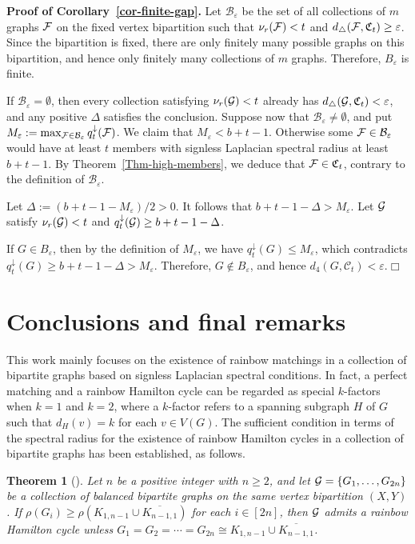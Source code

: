 \documentclass[11pt,a4paper]{article}
\newtheorem{theorem}{Theorem}[section]
\theoremstyle{definition}
\numberwithin{equation}{section}
\def\qed{\hfill$\Box$\vspace{12pt}}
\begin{document}
\noindent \textbf{Proof of Corollary~\ref{cor-finite-gap}.}
Let $\mathcal B_\varepsilon$ be the set of all collections of $m$ graphs ${\cal F}$ on the fixed vertex bipartition such that $\nu_r({\cal F})<t$ and $d_\triangle({\cal F},\mathfrak C_t)\ge\varepsilon$. Since the bipartition is fixed, there are only finitely many possible graphs on this bipartition, and hence only finitely many collections of
$m$ graphs. Therefore, $B_\varepsilon$ is finite.

If $\mathcal B_\varepsilon=\emptyset$, then every collection satisfying $\nu_r({\cal G})<t$ already has $d_\triangle({\cal G},\mathfrak C_t)<\varepsilon$, and any positive $\Delta$ satisfies the conclusion. Suppose now that $\mathcal B_\varepsilon\ne\emptyset$, and put $M_\varepsilon:=\max_{{\cal F}\in\mathcal B_\varepsilon} q_t^\downarrow({\cal F})$. We claim that $M_\varepsilon<b+t-1$. Otherwise some ${\cal F}\in\mathcal B_\varepsilon$ would have at least $t$ members with signless Laplacian spectral radius at least $b+t-1$. By Theorem~\ref{Thm-high-members}, we deduce that ${\cal F}\in\mathfrak C_t$, contrary to the definition of $\mathcal B_\varepsilon$.

Let $\Delta:=(b+t-1-M_\varepsilon)/2>0$. It follows that $b+t-1-\Delta>M_\varepsilon$. Let ${\cal G}$ satisfy $\nu_r({\cal G})<t$ and $q_t^\downarrow({\cal G})\ge b+t-1-\Delta$.

If $G\in B_\varepsilon$, then by the definition of $M_\varepsilon$, we have $q_t^\downarrow(G)\le M_\varepsilon$, which contradicts $q_t^\downarrow(G)\ge b+t-1-\Delta>M_\varepsilon$. Therefore, $G\notin B_\varepsilon$, and hence   $d_4(G,\mathcal C_t)<\varepsilon$.\qed


\section{Conclusions and final remarks}
This work mainly focuses on the existence of rainbow matchings in a collection of bipartite graphs based on signless Laplacian spectral conditions. In fact, a perfect matching and a rainbow Hamilton cycle can be regarded as special $k$-factors when $k=1$ and $k=2$, where a $k$-factor refers to a spanning subgraph $H$ of $G$ such that ${d_H(v)}=k$ for each $v\in V(G)$. The sufficient condition in terms of the spectral radius for the existence of rainbow Hamilton cycles in a collection of bipartite graphs has been established, as follows.

\begin{theorem}[\cite{Chen}]\label{Thm2b}
Let $n$ be a positive integer with $n\geq2$, and let ${\cal G}=\{{G_1},\ldots,{G_{2n}}\} $ be a collection of balanced bipartite graphs on the same vertex bipartition $(X,Y)$. If $\rho({{G_i}})\ge\rho({{K_{1,n-1}}\cup\overline{{K_{n-1,1}}}})$
for each $i\in [2n]$, then ${\cal G}$ admits a rainbow Hamilton cycle unless ${G_1}={G_2}=\cdots={G_{2n}}\cong{K_{1,n-1}}\cup\overline{{K_{n-1,1}}}$.
\end{theorem}
\end{document}

